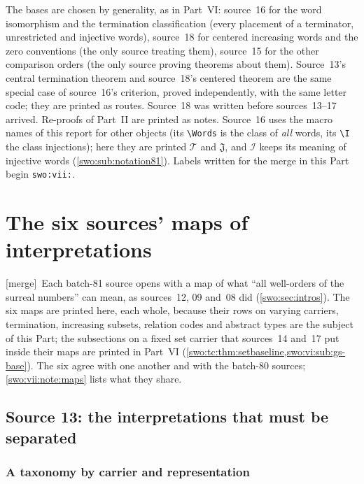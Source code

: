 \documentclass[11pt]{article}
\theoremstyle{definition}
\theoremstyle{remark}
\newcommand{\Words}{\mathcal I}
\newcommand{\I}{\mathcal I}
\newcommand{\WordsAll}{\mathcal T}
\newcommand{\Jinj}{\mathfrak J}
\newcommand{\code}[1]{\texttt{\small #1}}
\newcommand{\merge}{\textsf{[merge]}}
\begin{document}
The bases are chosen by generality, as in Part~VI: source~16 for the word
isomorphism and the termination classification (every placement of a
terminator, unrestricted and injective words), source~18 for centered
increasing words and the zero conventions (the only source treating them),
source~15 for the other comparison orders (the only source proving theorems
about them). Source~13's central termination theorem and source~18's
centered theorem are the same special case of source~16's criterion, proved
independently, with the same letter code; they are printed as routes.
Source~18 was written before sources~13--17 arrived. Re-proofs of Part~II
are printed as notes. Source~16 uses the macro names of this report for other
objects (its \verb|\Words| is the class of \emph{all} words, its \verb|\I| the
class injections); here they are printed $\WordsAll$ and $\Jinj$, and
$\Words$ keeps its meaning of injective words (\cref{swo:sub:notation81}).
Labels written for the merge in this Part begin \code{swo:vii:}.

\section{The six sources' maps of interpretations}\label{swo:vii:sec:maps}

\merge\ Each batch-81 source opens with a map of what ``all well-orders of
the surreal numbers'' can mean, as sources~12, 09 and~08 did
(\cref{swo:sec:intros}). The six maps are printed here, each whole, because
their rows on varying carriers, termination, increasing subsets, relation
codes and abstract types are the subject of this Part; the subsections on a
fixed set carrier that sources~14 and~17 put inside their maps are printed in
Part~VI (\cref{swo:tc:thm:setbaseline,swo:vi:sub:gs-base}). The six agree with
one another and with the batch-80 sources; \cref{swo:vii:note:maps} lists
what they share.

\subsection{Source 13: the interpretations that must be separated}\label{swo:fs:sec:interpretations}

\subsubsection{A taxonomy by carrier and representation}
\end{document}
